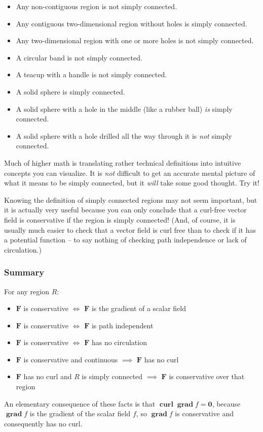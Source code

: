 \documentclass{myarticle}
\DeclareMathOperator{\grad}{\mathbf{grad}}
\DeclareMathOperator{\curl}{\mathbf{curl}}
\renewcommand{\vec}[1]{\mathbf{#1}}
\theoremstyle{nospace}
\newtheorem{old series theorem}{Theorem}
\newenvironment{series theorem}
{\begin{mdframed}\begin{old series theorem}}
    {\end{old series theorem}\end{mdframed}}
\begin{document}
\begin{itemize}
\item Any non-contiguous region is not simply connected.
\item Any contiguous two-dimensional region without holes is simply
  connected.
\item Any two-dimensional region with one or more holes is not simply
  connected.
\item A circular band is not simply connected.
\item A teacup with a handle is not simply connected.
\item A solid sphere is simply connected.
\item A solid sphere with a hole in the middle (like a rubber ball)
  \textit{is} simply connected.
\item A solid sphere with a hole drilled all the way through it is
  \textit{not} simply connected.
\end{itemize}

Much of higher math is translating rather technical definitions into
intuitive concepts you can visualize. It is \textit{not} difficult to
get an accurate mental picture of what it means to be simply
connected, but it \textit{will} take some good thought. Try it!

Knowing the definition of simply connected regions may not seem
important, but it is actually very useful because you can only
conclude that a curl-free vector field is conservative if the region
is simply connected! (And, of course, it is usually much easier to
check that a vector field is curl free than to check if it has a
potential function -- to say nothing of checking path independence or
lack of circulation.)

\subsubsection{Summary}
\label{sec:conservative vector fields summary}

For any region $R$:
\begin{itemize}
\item $\vec{F}$ is conservative $\iff$ $\vec{F}$ is the gradient of a
  scalar field
\item $\vec{F}$ is conservative $\iff$ $\vec{F}$ is path independent
\item $\vec{F}$ is conservative $\iff$ $\vec{F}$ has no circulation
\item $\vec{F}$ is conservative and continuous $\implies$ $\vec{F}$
  has no curl
\item $\vec{F}$ has no curl and $R$ is simply connected $\implies$
  $\vec{F}$ is conservative over that region
\end{itemize}

An elementary consequence of these facts is that
$\curl \grad f = \vec{0}$, because $\grad f$ is the gradient of the
scalar field $f$, so $\grad f$ is conservative and consequently has no
curl.
\end{document}
